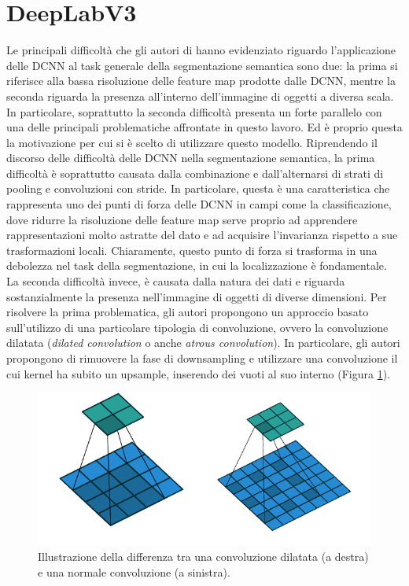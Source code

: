 \section{DeepLabV3}
\label{paragr_deeplabv3}
Le principali difficoltà che gli autori di \cite{deeplabv1, deeplabv2, deeplabv3} hanno evidenziato riguardo l'applicazione delle DCNN al task generale della segmentazione semantica sono due: la prima si riferisce alla bassa risoluzione delle feature map prodotte dalle DCNN, mentre la seconda riguarda la presenza all'interno dell'immagine di oggetti a diversa scala. In particolare, soprattutto la seconda difficoltà presenta un forte parallelo con una delle principali problematiche affrontate in questo lavoro. Ed è proprio questa la motivazione per cui si è scelto di utilizzare questo modello. Riprendendo il discorso delle difficoltà delle DCNN nella segmentazione semantica, la prima difficoltà è soprattutto causata dalla combinazione e dall'alternarsi di strati di pooling e convoluzioni con stride. In particolare, questa è una caratteristica che rappresenta uno dei punti di forza delle DCNN in campi come la classificazione, dove ridurre la risoluzione delle feature map serve proprio ad apprendere rappresentazioni molto astratte del dato e ad acquisire l'invarianza rispetto a sue trasformazioni locali. Chiaramente, questo punto di forza si trasforma in una debolezza nel task della segmentazione, in cui la localizzazione è fondamentale. La seconda difficoltà invece, è causata dalla natura dei dati e riguarda sostanzialmente la presenza nell'immagine di oggetti di diverse dimensioni. Per risolvere la prima problematica, gli autori propongono un approccio basato sull'utilizzo di una particolare tipologia di convoluzione, ovvero la convoluzione dilatata (\textit{dilated convolution} o anche \textit{atrous convolution}). In particolare, gli autori propongono di rimuovere la fase di downsampling e utilizzare una convoluzione il cui kernel ha subito un upsample, inserendo dei vuoti al suo interno (Figura \ref{fig:dilated_conv}).
\\
\begin{figure}[h!]
    \centering
    \hspace*{0.1in}
    \includegraphics[scale=0.5]{img/dilated2.png}
    \caption{Illustrazione della differenza tra una convoluzione dilatata (a destra) e una normale convoluzione (a sinistra).}
    \label{fig:dilated_conv}
\end{figure}

